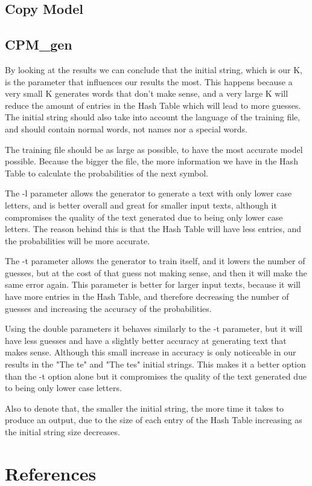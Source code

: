 \documentclass{article}
\begin{document}
\subsection{Copy Model}

\subsection{CPM_gen}


By looking at the results we can conclude that the initial string, which is our K, is the parameter that influences our results the most.
This happens because a very small K generates words that don't make sense, and a very large K will reduce the amount of entries 
in the Hash Table which will lead to more guesses. The initial string should also take into account the language of the training file,
and should contain normal words, not names nor a special words. 

The training file should be as large as possible, to have the most accurate model possible. Because the bigger the file, the more 
information we have in the Hash Table to calculate the probabilities of the next symbol.

The -l parameter allows the generator to generate a text with only lower case letters, and is better overall and great for smaller input texts,
although it compromises the quality of the text generated due to being only lower case letters. 
The reason behind this is that the Hash Table will have less entries, and the probabilities will be more accurate.

The -t parameter allows the generator to train itself, and it lowers the number of guesses, but at the cost of that guess not making sense,
and then it will make the same error again. This parameter is better for larger input texts, because it will have more entries in the Hash Table,
and therefore decreasing the number of guesses and increasing the accuracy of the probabilities.

Using the double parameters it behaves similarly to the -t parameter, but it will have less guesses and have a slightly better accuracy at generating text that makes sense.
Although this small increase in accuracy is only noticeable in our results in the "The te" and "The tes" initial strings.
This makes it a better option than the -t option alone but it compromises the quality of the text generated due to being only lower case letters.

Also to denote that, the smaller the initial string, the more time it takes to produce an output, due to the size of each entry of 
the Hash Table increasing as the initial string size decreases. 


\section{References}


\end{document}
